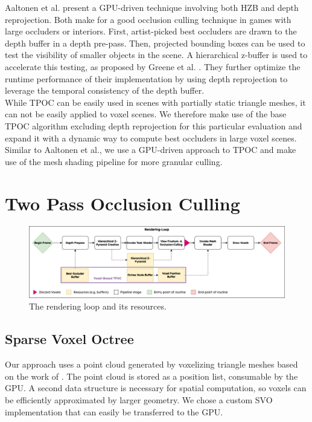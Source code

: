 \documentclass[conference]{IEEEtran}
\begin{document}
\noindent
Aaltonen et al. \cite{b4} present a \ac{GPU}-driven technique involving both \ac{HZB} and depth 
reprojection. Both make for a good occlusion culling technique in games with large occluders or 
interiors. First, artist-picked best occluders are drawn to the depth buffer in a depth pre-pass. 
Then, projected bounding boxes can be used to test the visibility of smaller objects in the scene. 
A hierarchical z-buffer is used to accelerate this testing, as proposed by Greene et al. \cite{b1}. 
They further optimize the runtime performance of their implementation by using depth reprojection 
to leverage the temporal consistency of the depth buffer. \\

\noindent
While \ac{TPOC} can be easily used in scenes with partially static triangle meshes, it can not be 
easily applied to voxel scenes. We therefore make use of the base \ac{TPOC} algorithm excluding depth 
reprojection for this particular evaluation and expand it with a dynamic way to compute best occluders 
in large voxel scenes. Similar to Aaltonen et al., we use a \ac{GPU}-driven approach to \ac{TPOC} and 
make use of the mesh shading pipeline for more granular culling.


\section{Two Pass Occlusion Culling} \label{sec-hierarchical-z-buffering}

\begin{figure}
    \includegraphics[width=\linewidth]{images/pipeline-rendering-loop.png}
    \caption{The rendering loop and its resources.}
    \label{fig:rendering-loop}
\end{figure}

\subsection{Sparse Voxel Octree}

\noindent
Our approach uses a point cloud generated by voxelizing triangle meshes based on the work of \cite{b5}. 
The point cloud is stored as a position list, consumable by the \ac{GPU}. A second data structure is 
necessary for spatial computation, so voxels can be efficiently approximated by larger geometry. 
We chose a custom \ac{SVO} implementation that can easily be transferred to the \ac{GPU}. \\
\end{document}
